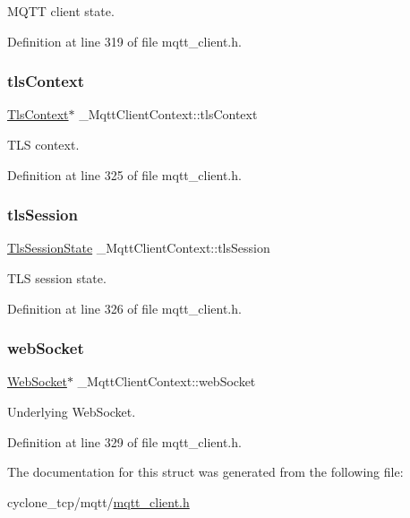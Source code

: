 M\+Q\+TT client state. 



Definition at line 319 of file mqtt\+\_\+client.\+h.

\mbox{\label{struct__MqttClientContext_a608d4cfa1093feabf50d4b543d2c2184}} 
\subsubsection{\texorpdfstring{tls\+Context}{tlsContext}}
{\footnotesize\ttfamily \hyperlink{tls_8h_ac09f7a286c0cdf9b07ee1edd107946f5}{Tls\+Context}$\ast$ \+\_\+\+Mqtt\+Client\+Context\+::tls\+Context}



T\+LS context. 



Definition at line 325 of file mqtt\+\_\+client.\+h.

\mbox{\label{struct__MqttClientContext_a03c2de5c5dff20ef248a91630cbe0e4b}} 
\subsubsection{\texorpdfstring{tls\+Session}{tlsSession}}
{\footnotesize\ttfamily \hyperlink{structTlsSessionState}{Tls\+Session\+State} \+\_\+\+Mqtt\+Client\+Context\+::tls\+Session}



T\+LS session state. 



Definition at line 326 of file mqtt\+\_\+client.\+h.

\mbox{\label{struct__MqttClientContext_ab8b561bb1053fde3ea81d0b4802ca49e}} 
\subsubsection{\texorpdfstring{web\+Socket}{webSocket}}
{\footnotesize\ttfamily \hyperlink{web__socket_8h_aad796fb4e3af91c4358c5b273d4a2028}{Web\+Socket}$\ast$ \+\_\+\+Mqtt\+Client\+Context\+::web\+Socket}



Underlying Web\+Socket. 



Definition at line 329 of file mqtt\+\_\+client.\+h.



The documentation for this struct was generated from the following file\+:\begin{DoxyCompactItemize}
\item 
cyclone\+\_\+tcp/mqtt/\hyperlink{mqtt__client_8h}{mqtt\+\_\+client.\+h}\end{DoxyCompactItemize}

